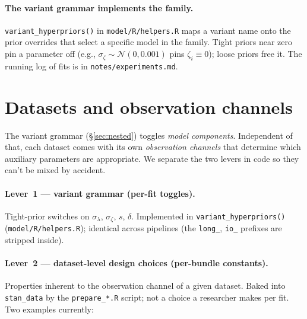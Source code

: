 \documentclass[11pt]{article}
\newcommand{\Norm}{\mathcal{N}}
\begin{document}
\paragraph{The variant grammar implements the family.}
\texttt{variant\_hyperpriors()} in \texttt{model/R/helpers.R} maps a
variant name onto the prior overrides that select a specific model in
the family. Tight priors near zero pin a parameter off (e.g.,
\(\sigma_\zeta \sim \Norm(0, 0.001)\) pins \(\zeta_i \equiv 0\)); loose
priors free it. The running log of fits is in
\texttt{notes/experiments.md}.

\section{Datasets and observation channels}
\label{sec:channels}

The variant grammar (§\ref{sec:nested}) toggles \emph{model
components}. Independent of that, each dataset comes with its own
\emph{observation channels} that determine which auxiliary parameters
are appropriate. We separate the two levers in code so they can't be
mixed by accident.

\paragraph{Lever~1 — variant grammar (per-fit toggles).}
Tight-prior switches on \(\sigma_\lambda\), \(\sigma_\zeta\),
\(s\), \(\delta\). Implemented in
\texttt{variant\_hyperpriors()} (\texttt{model/R/helpers.R}); identical
across pipelines (the \texttt{long\_}, \texttt{io\_} prefixes are
stripped inside).

\paragraph{Lever~2 — dataset-level design choices (per-bundle constants).}
Properties inherent to the observation channel of a given dataset.
Baked into \texttt{stan\_data} by the \texttt{prepare\_*.R} script;
not a choice a researcher makes per fit. Two examples currently:
\end{document}
